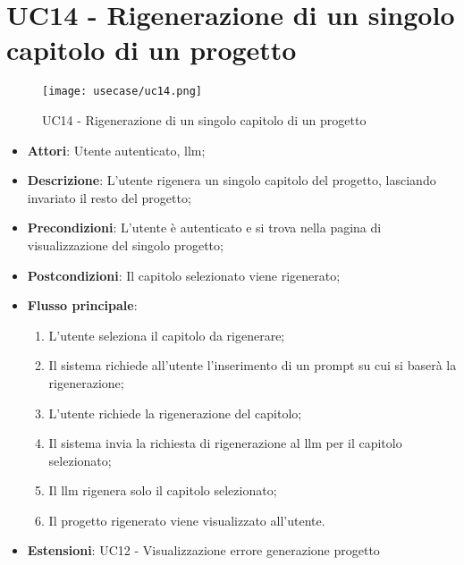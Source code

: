 \section*{UC14 - Rigenerazione di un singolo capitolo di un progetto}
\begin{figure}[H]
    \centering
    \texttt{[image: usecase/uc14.png]}
    \caption{UC14 - Rigenerazione di un singolo capitolo di un progetto}
    \label{fig:uc14}
\end{figure}
\begin{itemize}
    \item \textbf{Attori}: Utente autenticato, \gls{llm};
    \item \textbf{Descrizione}: L'utente rigenera un singolo capitolo del progetto, lasciando invariato il resto del progetto;
    \item \textbf{Precondizioni}: L'utente è autenticato e si trova nella pagina di visualizzazione del singolo progetto;
    \item \textbf{Postcondizioni}: Il capitolo selezionato viene rigenerato;
    \item \textbf{Flusso principale}:
    \begin{enumerate}
        \item L'utente seleziona il capitolo da rigenerare;
        \item Il sistema richiede all’utente l’inserimento di un \gls{prompt} su cui si baserà la rigenerazione;
        \item L’utente richiede la rigenerazione del capitolo;
        \item Il sistema invia la richiesta di rigenerazione al \gls{llm} per il capitolo selezionato;
        \item Il \gls{llm} rigenera solo il capitolo selezionato;
        \item Il progetto rigenerato viene visualizzato all'utente.
    \end{enumerate}
    \item \textbf{Estensioni}: UC12 - Visualizzazione errore generazione progetto
\end{itemize}

\vspace{0.5cm}  
